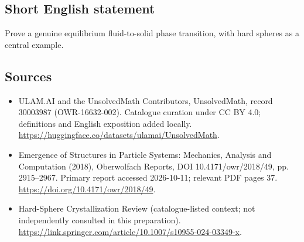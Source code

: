 \documentclass[11pt]{article}
\begin{document}
\subsection{Short English statement}
Prove a genuine equilibrium fluid-to-solid phase transition, with hard spheres as a central example.
\subsection{Sources}
\begin{itemize}
\item[\hypertarget{source:30003987:1}{S1}] ULAM.AI and the UnsolvedMath Contributors, UnsolvedMath, record 30003987 (OWR-16632-002). Catalogue curation under CC BY 4.0; definitions and English exposition added locally.
\url{https://huggingface.co/datasets/ulamai/UnsolvedMath}.
\item[\hypertarget{source:30003987:2}{S2}] Emergence of Structures in Particle Systems: Mechanics, Analysis and Computation (2018), Oberwolfach Reports, DOI 10.4171/owr/2018/49, pp. 2915--2967. Primary report accessed 2026-10-11; relevant PDF pages 37.
\url{https://doi.org/10.4171/owr/2018/49}.
\item[\hypertarget{source:30003987:3}{S3}] Hard-Sphere Crystallization Review (catalogue-listed context; not independently consulted in this preparation).
\url{https://link.springer.com/article/10.1007/s10955-024-03349-x}.
\end{itemize}
\label{end:30003987}
\end{document}
